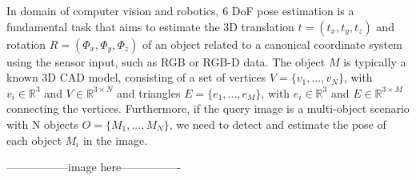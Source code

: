 \documentclass[12pt,DIV14,BCOR12mm,a4paper,footinclude=false,headinclude,parskip=half-,twoside,openright,cleardoublepage=empty,toc=index,bibliography=totoc,listof=totoc]{scrreprt}
\numberwithin{equation}{chapter}
\begin{document}
In domain of computer vision and robotics, 6 DoF pose estimation is a fundamental task that aims to estimate the 3D translation $t=(t_{x} ,t_{y} ,t_{z} )$ 
and rotation $R=(\Phi_{x} ,\Phi_{y} ,\Phi_{z} )$ of an object related to a canonical coordinate system using the sensor input, such as RGB or RGB-D data\cite{peng_pvnet_2019}.
The object $M$ is typically a known 3D CAD model, consisting of a set of vertices $V=\{v_1,...,v_N\}$, 
with $v_i\in \mathbb{R}^3$ and $V\in \mathbb{R}^{3 \times N}$ and triangles $E=\{e_1,...,e_M\}$, 
with $e_i\in \mathbb{R}^3$ and $E\in \mathbb{R}^{3\times M}$ connecting the vertices. 
Furthermore, if the query image is a multi-object scenario with N objects $O=\{M_1,...,M_N\}$, 
we need to detect and estimate the pose of each object $M_i$ in the image\cite{Fabian_2021}.

-----------------image here----------------
\end{document}
